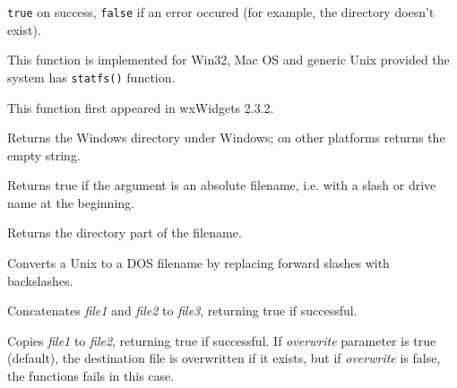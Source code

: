 {\tt true} on success, {\tt false} if an error occured (for example, the
directory doesn't exist).


This function is implemented for Win32,
Mac OS and generic Unix provided the system has {\tt statfs()} function.

This function first appeared in wxWidgets 2.3.2.


\label{wxgetosdirectory}


Returns the Windows directory under Windows; on other platforms returns the empty string.


\label{wxisabsolutepath}


Returns true if the argument is an absolute filename, i.e. with a slash
or drive name at the beginning.


\label{wxpathonly}


Returns the directory part of the filename.


\label{wxunix2dosfilename}


Converts a Unix to a DOS filename by replacing forward
slashes with backslashes.


\label{wxconcatfiles}


Concatenates {\it file1} and {\it file2} to {\it file3}, returning
true if successful.


\label{wxcopyfile}


Copies {\it file1} to {\it file2}, returning true if successful. If
{\it overwrite} parameter is true (default), the destination file is overwritten
if it exists, but if {\it overwrite} is false, the functions fails in this
case.


